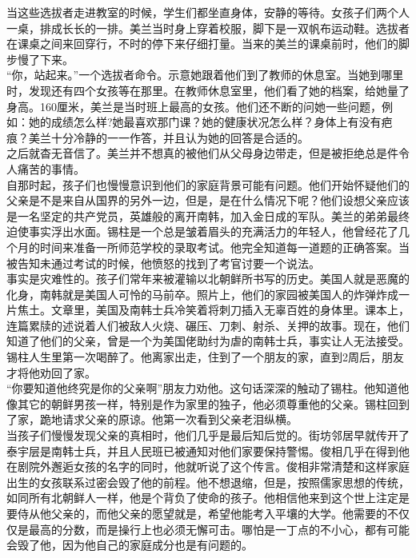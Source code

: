 当这些选拔者走进教室的时候，学生们都坐直身体，安静的等待。女孩子们两个人一桌，排成长长的一排。美兰当时身上穿着校服，脚下是一双帆布运动鞋。选拔者在课桌之间来回穿行，不时的停下来仔细打量。当来的美兰的课桌前时，他们的脚步慢了下来。\\

“你，站起来。”一个选拔者命令。示意她跟着他们到了教师的休息室。当她到哪里时，发现还有四个女孩等在那里。在教师休息室里，他们看了她的档案，给她量了身高。160厘米，美兰是当时班上最高的女孩。他们还不断的问她一些问题，例如：她的成绩怎么样?她最喜欢那门课？她的健康状况怎么样？身体上有没有疤痕？美兰十分冷静的一一作答，并且认为她的回答是合适的。\\

之后就杳无音信了。美兰并不想真的被他们从父母身边带走，但是被拒绝总是件令人痛苦的事情。\\

自那时起，孩子们也慢慢意识到他们的家庭背景可能有问题。他们开始怀疑他们的父亲是不是来自从国界的另外一边，但是，是在什么情况下呢？他们设想父亲应该是一名坚定的共产党员，英雄般的离开南韩，加入金日成的军队。美兰的弟弟最终迫使事实浮出水面。锡柱是一个总是皱着眉头的充满活力的年轻人，他曾经花了几个月的时间来准备一所师范学校的录取考试。他完全知道每一道题的正确答案。当被告知未通过考试的时候，他愤怒的找到了考官讨要一个说法。\\

事实是灾难性的。孩子们常年来被灌输以北朝鲜所书写的历史。美国人就是恶魔的化身，南韩就是美国人可怜的马前卒。照片上，他们的家园被美国人的炸弹炸成一片焦土。文章里，美国及南韩士兵冷笑着将刺刀插入无辜百姓的身体里。课本上，连篇累牍的述说着人们被敌人火烧、碾压、刀刺、射杀、关押的故事。现在，他们知道了他们的父亲，曾是一个为美国佬助纣为虐的南韩士兵，事实让人无法接受。锡柱人生里第一次喝醉了。他离家出走，住到了一个朋友的家，直到2周后，朋友才将他劝回了家。\\

“你要知道他终究是你的父亲啊”朋友力劝他。这句话深深的触动了锡柱。他知道他像其它的朝鲜男孩一样，特别是作为家里的独子，他必须尊重他的父亲。锡柱回到了家，跪地请求父亲的原谅。他第一次看到父亲老泪纵横。\\

当孩子们慢慢发现父亲的真相时，他们几乎是最后知后觉的。街坊邻居早就传开了泰宇层是南韩士兵，并且人民班已被通知对他们家要保持警惕。俊相几乎在得到他在剧院外邂逅女孩的名字的同时，他就听说了这个传言。俊相非常清楚和这样家庭出生的女孩联系过密会毁了他的前程。他不想退缩，但是，按照儒家思想的传统，如同所有北朝鲜人一样，他是个背负了使命的孩子。他相信他来到这个世上注定是要侍从他父亲的，而他父亲的愿望就是，希望他能考入平壤的大学。他需要的不仅仅是最高的分数，而是操行上也必须无懈可击。哪怕是一丁点的不小心，都有可能会毁了他，因为他自己的家庭成分也是有问题的。\\

